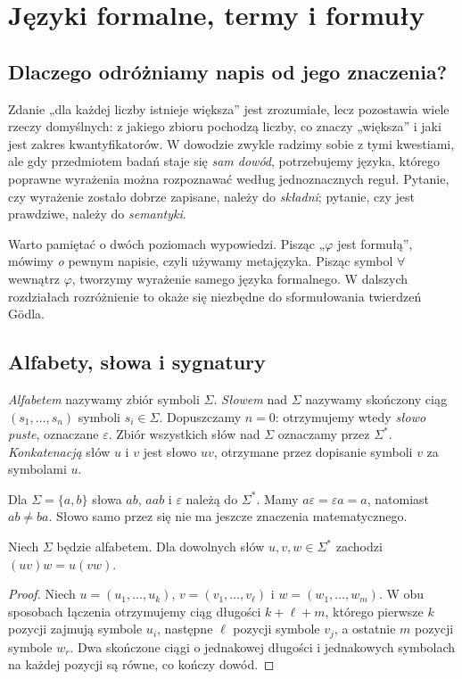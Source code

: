 \chapter{Języki formalne, termy i formuły}\label{ch:syntax-fol}

\section{Dlaczego odróżniamy napis od jego znaczenia?}
Zdanie „dla każdej liczby istnieje większa” jest zrozumiałe, lecz pozostawia wiele
rzeczy domyślnych: z jakiego zbioru pochodzą liczby, co znaczy „większa” i jaki
jest zakres kwantyfikatorów. W dowodzie zwykle radzimy sobie z tymi kwestiami,
ale gdy przedmiotem badań staje się \emph{sam dowód}, potrzebujemy języka,
którego poprawne wyrażenia można rozpoznawać według jednoznacznych reguł.
Pytanie, czy wyrażenie zostało dobrze zapisane, należy do \emph{składni};
pytanie, czy jest prawdziwe, należy do \emph{semantyki}.

Warto pamiętać o dwóch poziomach wypowiedzi. Pisząc „$\varphi$ jest formułą”,
mówimy \emph{o} pewnym napisie, czyli używamy metajęzyka. Pisząc symbol $\forall$
wewnątrz $\varphi$, tworzymy wyrażenie samego języka formalnego. W dalszych
rozdziałach rozróżnienie to okaże się niezbędne do sformułowania twierdzeń Gödla.

\section{Alfabety, słowa i sygnatury}
\begin{definicja}\label{def:syntax-alphabet}
\emph{Alfabetem} nazywamy zbiór symboli $\Sigma$. \emph{Słowem} nad $\Sigma$
nazywamy skończony ciąg $(s_1,\ldots,s_n)$ symboli $s_i\in\Sigma$.
Dopuszczamy $n=0$: otrzymujemy wtedy \emph{słowo puste}, oznaczane $\varepsilon$.
Zbiór wszystkich słów nad $\Sigma$ oznaczamy przez $\Sigma^*$.
\emph{Konkatenacją} słów $u$ i $v$ jest słowo $uv$, otrzymane przez dopisanie
symboli $v$ za symbolami $u$.
\end{definicja}
\begin{przyklad}
Dla $\Sigma=\{a,b\}$ słowa $ab$, $aab$ i $\varepsilon$ należą do $\Sigma^*$.
Mamy $a\varepsilon=\varepsilon a=a$, natomiast $ab\ne ba$.
Słowo samo przez się nie ma jeszcze znaczenia matematycznego.
\end{przyklad}
\begin{stwierdzenie}\label{prop:syntax-concat}
Niech $\Sigma$ będzie alfabetem. Dla dowolnych słów $u,v,w\in\Sigma^*$ zachodzi $(uv)w=u(vw)$.
\end{stwierdzenie}
\begin{proof}
Niech $u=(u_1,\ldots,u_k)$, $v=(v_1,\ldots,v_\ell)$ i
$w=(w_1,\ldots,w_m)$. W obu sposobach łączenia otrzymujemy ciąg długości
$k+\ell+m$, którego pierwsze $k$ pozycji zajmują symbole $u_i$, następne
$\ell$ pozycji symbole $v_j$, a ostatnie $m$ pozycji symbole $w_r$.
Dwa skończone ciągi o jednakowej długości i jednakowych symbolach na każdej
pozycji są równe, co kończy dowód.
\end{proof}

